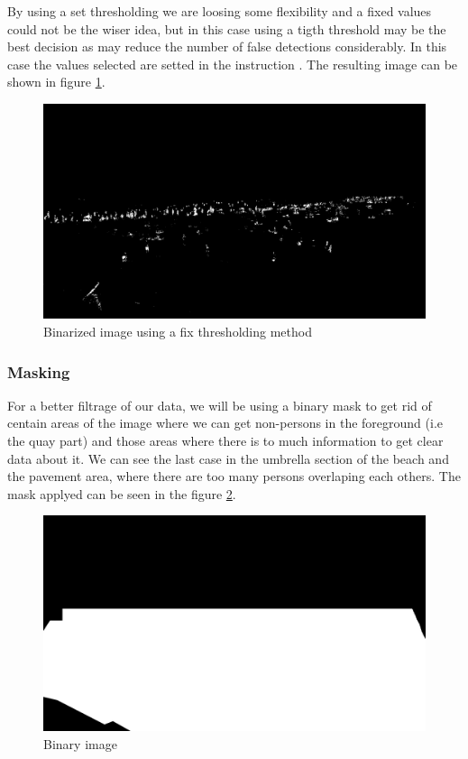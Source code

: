 \documentclass[10pt]{article}
\begin{document}
By using a set thresholding we are loosing some flexibility and a fixed values could not be the wiser idea, but in this case using a tigth threshold may be the best decision as may reduce the number of false detections considerably. In this case the values selected are setted in the instruction . The resulting image can be shown in figure \ref{fig:binth}.


\begin{figure} [hp]
    \centering
    \includegraphics[width=\textwidth]{img/bin_th.jpg}
    \caption{Binarized image using a fix thresholding method}
    \label{fig:binth}
\end{figure}

\subsubsection*{Masking}
For a better filtrage of our data, we will be using a binary mask to get rid of centain areas of the image where we can get non-persons in the foreground (i.e the quay part) and those areas where there is to much information to get clear data about it. We can see the last case in the umbrella section of the beach and the pavement area, where there are too many persons overlaping each others. The mask applyed can be seen in the figure \ref{fig:mask_ex}.

\begin{figure} [hp]
    \centering
    \includegraphics[width=\textwidth]{../mask.png}
    \caption{Binary image}
    \label{fig:mask_ex}
\end{figure}
\end{document}
